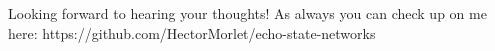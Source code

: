\documentclass[a4paper,12pt]{article}
\begin{document}
Looking forward to hearing your thoughts! As always you can check up on me here:
https://github.com/HectorMorlet/echo-state-networks


\end{document}
